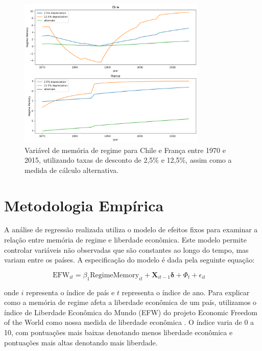 \begin{figure}[h!]
    \centering
    \caption{Variável de memória de regime para Chile e França entre 1970 e 2015, utilizando taxas de desconto de 2,5\% e 12,5\%, assim como a medida de cálculo alternativa.}
    \includegraphics[width=0.8\textwidth]{Textuais/chile.png}
\end{figure}

\section{Metodologia Empírica}

A análise de regressão realizada utiliza o modelo de efeitos fixos para examinar a relação entre memória de regime e liberdade econômica. Este modelo permite controlar variáveis não observadas que são constantes ao longo do tempo, mas variam entre os países. A especificação do modelo é dada pela seguinte equação:

\begin{equation}
    \text{EFW}_{it} = \beta_1 \text{RegimeMemory}_{it} + \mathbf{X}_{it-1} \boldsymbol{\delta} + \Phi_t + \epsilon_{it} \quad 
\end{equation}

onde $i$ representa o índice de país e $t$ representa o índice de ano. Para explicar como a memória de regime afeta a liberdade econômica de um país, utilizamos o índice de Liberdade Econômica do Mundo (EFW) do projeto Economic Freedom of the World como nossa medida de liberdade econômica \cite{gwartney2022}. O índice varia de 0 a 10, com pontuações mais baixas denotando menos liberdade econômica e pontuações mais altas denotando mais liberdade.


